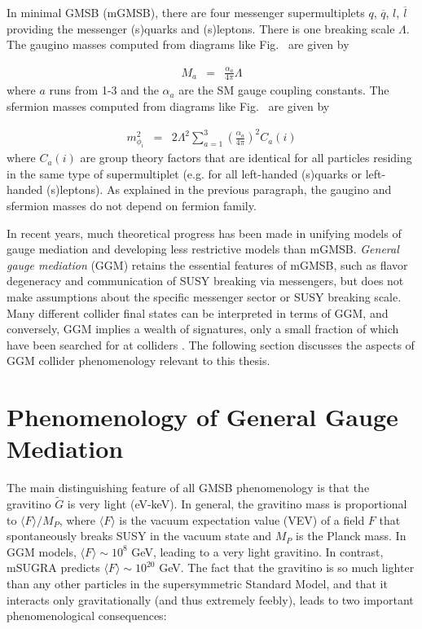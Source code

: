 \documentclass[dissertation.tex]{subfiles}
\begin{document}
In minimal GMSB (mGMSB), there are four messenger supermultiplets $q$, $\overline{q}$, $l$, $\overline{l}$ providing the messenger (s)quarks and (s)leptons.  There is one breaking scale $\Lambda$.  The gaugino masses computed from diagrams like Fig.~ are given by

\begin{eqnarray}
\label{eq:m_gaugino}
M_{a} &=& \frac{\alpha_{a}}{4\pi}\Lambda
\end{eqnarray}
%
where $a$ runs from 1-3 and the $\alpha_{a}$ are the SM gauge coupling constants.  The sfermion masses computed from diagrams like Fig.~ are given by

\begin{eqnarray}
\label{eq:m_sfermion}
m_{\phi_{i}}^{2} &=& 2\Lambda^{2}\sum_{a=1}^{3}(\frac{\alpha_{a}}{4\pi})^{2}C_{a}(i)
\end{eqnarray}
%
where $C_{a}(i)$ are group theory factors that are identical for all particles residing in the same type of supermultiplet (e.g. for all left-handed (s)quarks or left-handed (s)leptons).  As explained in the previous paragraph, the gaugino and sfermion masses do not depend on fermion family.

In recent years, much theoretical progress has been made in unifying models of gauge mediation and developing less restrictive models than mGMSB.  \textit{General gauge mediation} (GGM) \cite{Meade_Seiberg_and_Shih} retains the essential features of mGMSB, such as flavor degeneracy and communication of SUSY breaking via messengers, but does not make assumptions about the specific messenger sector or SUSY breaking scale.  Many different collider final states can be interpreted in terms of GGM, and conversely, GGM implies a wealth of signatures, only a small fraction of which have been searched for at colliders \cite{ATLAS_GMSB_1fb-1, CDF_2010_GMSB_paper, CMS_GMSB_1fb-1}.  The following section discusses the aspects of GGM collider phenomenology relevant to this thesis.

\section{Phenomenology of General Gauge Mediation}
\label{sec:Phenomenology of General Gauge Mediation}

The main distinguishing feature of all GMSB phenomenology is that the gravitino $\widetilde{G}$ is very light (eV-keV).  In general, the gravitino mass is proportional to $\langle F\rangle/M_{P}$, where $\langle F\rangle$ is the vacuum expectation value (VEV) of a field $F$ that spontaneously breaks SUSY in the vacuum state and $M_{P}$ is the Planck mass.  In GGM models, $\langle F\rangle \sim 10^{8}$ GeV, leading to a very light gravitino.  In contrast, mSUGRA predicts $\langle F\rangle \sim 10^{20}$ GeV.  The fact that the gravitino is so much lighter than any other particles in the supersymmetric Standard Model, and that it interacts only gravitationally (and thus extremely feebly), leads to two important phenomenological consequences:
\end{document}
